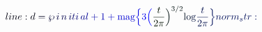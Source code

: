 \documentclass[12pt]{article}
\begin{document}
\makeatletter
\renewcommand*{\@textcolor}[3]{%
  \protect\leavevmode
  \begingroup
    \color#1{#2}#3%
  \endgroup
}
\makeatother
\begin{displaymath}
\mathcolor[RGB]{0,0,15}{line:
d} \mathcolor[RGB]{0,0,30}{=} \mathcolor[RGB]{0,0,45}{\wp} \, \mathcolor[RGB]{0,0,60}{i} \, \mathcolor[RGB]{0,0,75}{n} \, \mathcolor[RGB]{0,0,90}{i} \mathcolor[RGB]{0,0,105}{t} \mathcolor[RGB]{0,0,120}{i} \, \mathcolor[RGB]{0,0,135}{a} \mathcolor[RGB]{0,0,150}{l} \mathcolor[RGB]{0,0,165}{+} \mathcolor[RGB]{0,0,180}{1} \mathcolor[RGB]{0,0,195}{+} \mathcolor[RGB]{0,0,210}{\mbox{mag}} \mathcolor[RGB]{0,0,225}{\Big\{} \mathcolor[RGB]{0,0,240}{3} \mathcolor[RGB]{0,0,255}{\Big(} \mathcolor[RGB]{0,15,0}{\frac{t}{2\pi}} \mathcolor[RGB]{0,15,15}{\Big)^{3/2}} \mathrm { \mathcolor[RGB]{0,15,30}{l} \mathcolor[RGB]{0,15,45}{o} \mathcolor[RGB]{0,15,60}{g} } \mathcolor[RGB]{0,15,75}{\frac{t}{2\pi}} \mathcolor[RGB]{0,15,90}{\Big\}

norm_str:}
\end{displaymath}
\end{document}
